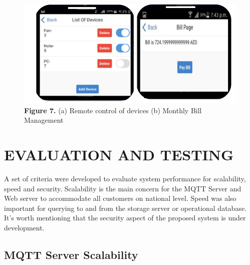 \documentclass[a4paper,12pt,oneside]{article}
\let\counterwithin\relax
\begin{document}
\begin{itemize}
\begin{figure}[H]
        \includegraphics{Figure7.png}
        \centering
        \caption[Remote control of devices and Monthly Bill Management]{\textbf{Figure 7.} (a) Remote control of devices \hspace{16ex} (b) Monthly Bill Management}
        \end{figure}
\end{itemize}

\newpage
\section{EVALUATION AND TESTING}
A set of criteria were developed to evaluate system
performance for scalability, speed and security. Scalability is
the main concern for the MQTT Server and Web server to
accommodate all customers on national level. Speed was also
important for querying to and from the storage server or
operational database. It’s worth mentioning that the security
aspect of the proposed system is under development.

\subsection{MQTT Server Scalability}
\end{document}

